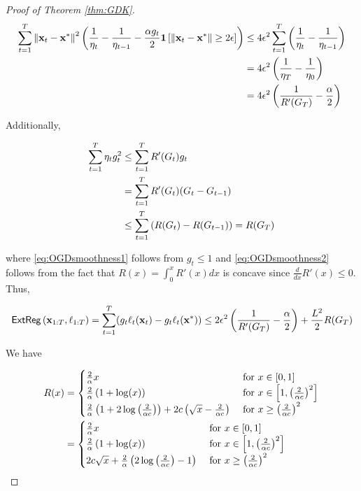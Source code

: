 \begin{proof}[Proof of Theorem \ref{thm:GDK}]
\begin{align*}
    \sum_{t=1}^T \left\|\mathbf{x}_t-\mathbf{x}^*\right\|^2 \left(\frac{1}{\eta_t}-\frac{1}{\eta_{t-1}} - \frac{\alpha g_t}{2}\mathbf{1}\left[\left\|\mathbf{x}_t-\mathbf{x}^*\right\| \geq 2 \epsilon\right]\right)
    &\leq 4\epsilon^2 \sum_{t=1}^T \left(\frac{1}{\eta_t}-\frac{1}{\eta_{t-1}}\right)\\
    &= 4\epsilon^2\left(\frac{1}{\eta_{T}}-\frac{1}{\eta_0}\right)\\
    &= 4\epsilon^2\left(\frac{1}{R'(G_T)}-\frac{\alpha}{2}\right)
\end{align*}

Additionally,

\begin{align}
    \sum_{t=1}^T \eta_t g_t^2 &\leq \sum_{t=1}^T R'(G_t)g_t \label{eq:OGDsmoothness1}\\
    &= \sum_{t=1}^T R'(G_t)(G_t-G_{t-1})\nonumber \\
    &\leq \sum_{t=1}^T \left(R(G_t)-R(G_{t-1})\right) = R(G_T)\label{eq:OGDsmoothness2}
\end{align}

where \eqref{eq:OGDsmoothness1} follows from $g_t \leq 1$ and \eqref{eq:OGDsmoothness2} follows from the fact that $R(x) = \int_0^x R'(x)dx$ is concave since $\frac{d}{dx}R'(x) \leq 0$.  Thus,

\begin{align*}
    \mathsf{ExtReg}\left(\mathbf{x}_{1:T},\ell_{1:T}\right) = \sum_{t=1}^T (g_t \ell_t(\mathbf{x}_t)-g_t \ell_t(\mathbf{x}^*)) \leq 2\epsilon^2\left(\frac{1}{R'(G_T)}-\frac{\alpha}{2}\right) + \frac{L^2}{2} R(G_T)
\end{align*}

We have

\begin{align*}
    R(x) &= \begin{cases}
        \frac{2}{\alpha}x & \text{ for }x \in [0,1]\\
        \frac{2}{\alpha}\left(1+\log(x)\right) & \text{ for }x \in \left[1,\left(\frac{2}{\alpha c}\right)^2\right]\\
        \frac{2}{\alpha}\left(1+2\log\left(\frac{2}{\alpha c}\right)\right) + 2c\left(\sqrt{x}-\frac{2}{\alpha c}\right) & \text{ for } x \geq \left(\frac{2}{\alpha c}\right)^2
    \end{cases}\\
    &= \begin{cases}
        \frac{2}{\alpha}x & \text{ for }x \in [0,1]\\
        \frac{2}{\alpha}\left(1+\log(x)\right) & \text{ for }x \in \left[1,\left(\frac{2}{\alpha c}\right)^2\right]\\
        2c\sqrt{x} + \frac{2}{\alpha}\left(2\log\left(\frac{2}{\alpha c}\right)-1\right)& \text{ for } x \geq \left(\frac{2}{\alpha c}\right)^2
    \end{cases}
\end{align*}


\end{proof}
